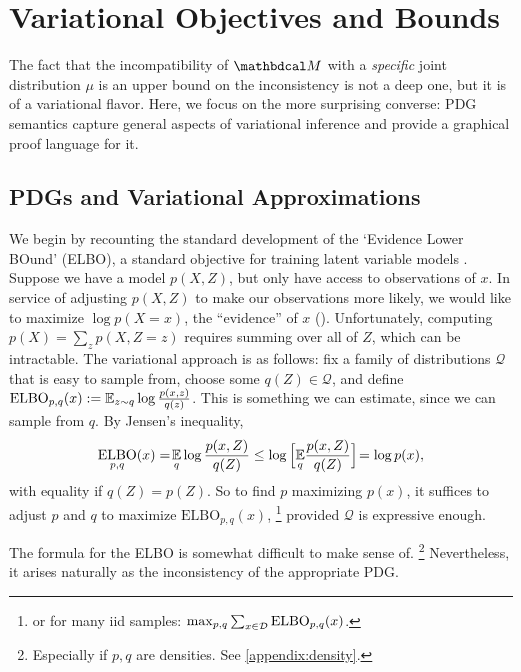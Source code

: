 \section{Variational Objectives and Bounds}
\label{sec:theory}


The fact that the incompatibility of $\dg M$ with a \emph{specific} joint distribution $\mu$ is an upper bound on the inconsistency is not a deep one, but it is of a variational flavor.
Here, we focus on the more surprising converse:  PDG semantics capture general aspects of variational inference and provide
a graphical proof language for it.

\subsection{PDGs and Variational Approximations}
\label{sec:variational}

We begin by recounting the standard development of the `Evidence Lower BOund' (ELBO), a standard objective for training latent variable models \parencite[\S2.2]{blei2017variational}.
Suppose we have a model $p(X,Z)$, but only have access to observations of $x$.
In service of adjusting $p(X,Z)$ to make our observations more likely, we would like to maximize $\log p(X\!\!=\!x)$, the ``evidence'' of $x$ ().
Unfortunately, computing $p(X) = \sum_z p(X,Z\!\!=\!z)$ requires summing over all of $Z$, which can be intractable.
The variational approach is as follows: fix a family of distributions $\mathcal Q$ that is easy to sample from, choose some $q(Z) \in \mathcal Q$, and define
$\mathrm{ELBO}_{p,q}(x) := \operatorname*{\mathbb{E}}_{z \sim q} \log \frac{p(x,z)}{q(z)}$.
This is something we can estimate, since we can sample from $q$. By Jensen's inequality,
\[
    \mathop{\mathrm{ELBO}}\limits_{p,q}(x)
    =\! \operatorname*{\mathbb{E}}_{q} \log \frac{p(x,Z)}{q(Z)}
    \le  \log \Big[\! \operatorname*{\mathbb{E}}_{q}\! \frac{p(x,Z)}{q(Z)} \Big]\!
    = \log p(x),
\]
with equality if $q(Z) = p(Z)$.
So to find $p$ maximizing $p(x)$, it suffices to adjust $p$ and $q$ to maximize $\mathrm{ELBO}_{p,q}(x)$,%
    \footnote{or for many iid samples: $\max_{p,q}\sum_{x \in {\mathcal D}}\mathrm{ELBO}_{p,q}(x)$.}
 provided $\mathcal Q$ is expressive enough.


The formula for the ELBO is somewhat difficult to make sense of.%
\footnote{Especially if $p, q$ are densities. See \cref{appendix:density}.}
Nevertheless, it arises naturally as the inconsistency of the
appropriate PDG.

